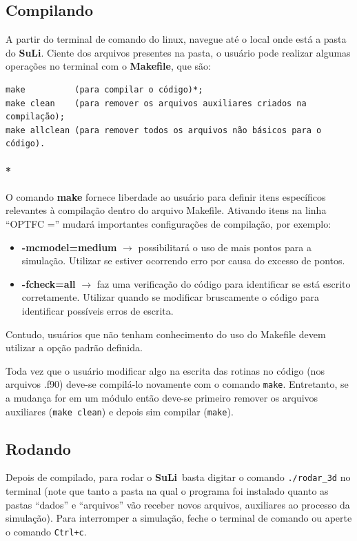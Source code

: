 \documentclass[12pt, a4paper]{article}
\newcommand{\SL}{{\bf SuLi}}
\begin{document}
\subsection{Compilando}
A partir do terminal de comando do linux, navegue até o local onde está a pasta do \SL . Ciente dos arquivos presentes na pasta, o usuário pode realizar algumas operações no terminal com o {\bf{Makefile}}, que são:
\label{limpar_dados}
\begin{verbatim}
make          (para compilar o código)*; 
make clean    (para remover os arquivos auxiliares criados na compilação);
make allclean (para remover todos os arquivos não básicos para o código).
\end{verbatim} 

\paragraph{*}	\label{infosmake}
O comando {\bf{make}} fornece liberdade ao usuário para definir itens específicos relevantes à compilação dentro do arquivo Makefile. Ativando itens na linha ``OPTFC ='' mudará importantes configurações de compilação, por exemplo:
\begin{itemize}


\item\textbf{-mcmodel=medium} $\rightarrow$ possibilitará o uso de mais pontos para a simulação. Utilizar se estiver ocorrendo erro por causa do excesso de pontos.

\item\textbf{-fcheck=all} $\rightarrow$ faz uma verificação do código para identificar se está escrito corretamente. Utilizar quando se modificar bruscamente o código para identificar possíveis erros de escrita.

\end{itemize}
Contudo, usuários que não tenham conhecimento do uso do Makefile devem utilizar a opção padrão definida.

Toda vez que o usuário modificar algo na escrita das rotinas no código (nos arquivos .f90) deve-se compilá-lo novamente com o comando \verb!make!. Entretanto, se a mudança for em um módulo então deve-se primeiro remover os arquivos auxiliares (\verb!make clean!) e depois sim compilar (\verb!make!).

\subsection{Rodando}

Depois de compilado, para rodar o \SL\ basta digitar o comando \verb!./rodar_3d! no terminal (note que tanto a pasta na qual o programa foi instalado quanto as pastas ``dados'' e ``arquivos'' vão receber novos arquivos, auxiliares ao processo da simulação). Para interromper a simulação, feche o terminal de comando ou aperte o comando \verb!Ctrl+c!.
\end{document}
